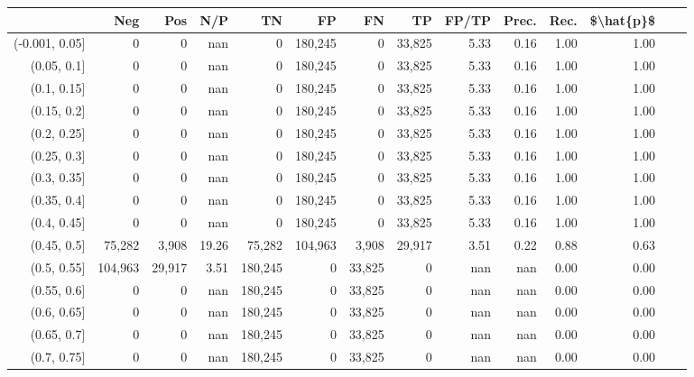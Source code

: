 \begin{tabular}{rrrrrrrrrrrrrr}
\toprule
{} &      Neg &     Pos &    N/P &       TN &       FP &      FN &      TP & FP/TP & Prec. &  Rec. & \$\textbackslash hat\{p\}\$ \\
\midrule
(-0.001, 0.05] &        0 &       0 &    nan &        0 &  180,245 &       0 &  33,825 &  5.33 &  0.16 &  1.00 &      1.00 \\
(0.05, 0.1]    &        0 &       0 &    nan &        0 &  180,245 &       0 &  33,825 &  5.33 &  0.16 &  1.00 &      1.00 \\
(0.1, 0.15]    &        0 &       0 &    nan &        0 &  180,245 &       0 &  33,825 &  5.33 &  0.16 &  1.00 &      1.00 \\
(0.15, 0.2]    &        0 &       0 &    nan &        0 &  180,245 &       0 &  33,825 &  5.33 &  0.16 &  1.00 &      1.00 \\
(0.2, 0.25]    &        0 &       0 &    nan &        0 &  180,245 &       0 &  33,825 &  5.33 &  0.16 &  1.00 &      1.00 \\
(0.25, 0.3]    &        0 &       0 &    nan &        0 &  180,245 &       0 &  33,825 &  5.33 &  0.16 &  1.00 &      1.00 \\
(0.3, 0.35]    &        0 &       0 &    nan &        0 &  180,245 &       0 &  33,825 &  5.33 &  0.16 &  1.00 &      1.00 \\
(0.35, 0.4]    &        0 &       0 &    nan &        0 &  180,245 &       0 &  33,825 &  5.33 &  0.16 &  1.00 &      1.00 \\
(0.4, 0.45]    &        0 &       0 &    nan &        0 &  180,245 &       0 &  33,825 &  5.33 &  0.16 &  1.00 &      1.00 \\
(0.45, 0.5]    &   75,282 &   3,908 &  19.26 &   75,282 &  104,963 &   3,908 &  29,917 &  3.51 &  0.22 &  0.88 &      0.63 \\
(0.5, 0.55]    &  104,963 &  29,917 &   3.51 &  180,245 &        0 &  33,825 &       0 &   nan &   nan &  0.00 &      0.00 \\
(0.55, 0.6]    &        0 &       0 &    nan &  180,245 &        0 &  33,825 &       0 &   nan &   nan &  0.00 &      0.00 \\
(0.6, 0.65]    &        0 &       0 &    nan &  180,245 &        0 &  33,825 &       0 &   nan &   nan &  0.00 &      0.00 \\
(0.65, 0.7]    &        0 &       0 &    nan &  180,245 &        0 &  33,825 &       0 &   nan &   nan &  0.00 &      0.00 \\
(0.7, 0.75]    &        0 &       0 &    nan &  180,245 &        0 &  33,825 &       0 &   nan &   nan &  0.00 &      0.00 \\

\end{tabular}
